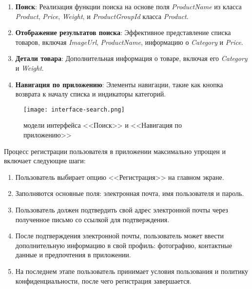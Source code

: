 \begin{enumerate}
    \item \textbf{Поиск}: Реализация функции поиска на основе поля \textit{ProductName} из класса \textit{Product}, \textit{Price}, \textit{Weight}, и \textit{ProductGroupId} класса \textit{Product}.
    \item \textbf{Отображение результатов поиска}: Эффективное представление списка товаров, включая \textit{ImageUrl}, \textit{ProductName}, информацию о \textit{Category} и \textit{Price}.
    \item \textbf{Детали товара}: Дополнительная информация о товаре, включая его \textit{Category} и \textit{Weight}.
    \item \textbf{Навигация по приложению}: Элементы навигации, такие как кнопка возврата к началу списка и индикаторы категорий.
\end{enumerate}

\begin{figure}[h!]
    \texttt{[image: interface-search.png]}
    \caption{модели интерфейса <<Поиск>> и <<Навигация по приложению>>}
    \label{fig:search}
\end{figure}

Процесс регистрации пользователя в приложении максимально упрощен и включает следующие шаги:
\begin{enumerate}
    \item Пользователь выбирает опцию <<Регистрация>> на главном экране.
    \item Заполняются основные поля: электронная почта, имя пользователя и пароль.
    \item Пользователь должен подтвердить свой адрес электронной почты через полученное письмо со ссылкой для подтверждения.
    \item После подтверждения электронной почты, пользователь может ввести дополнительную информацию в свой профиль: фотографию, контактные данные и предпочтения в приложении.
    \item На последнем этапе пользователь принимает условия пользования и политику конфиденциальности, после чего регистрация завершается.
\end{enumerate}

